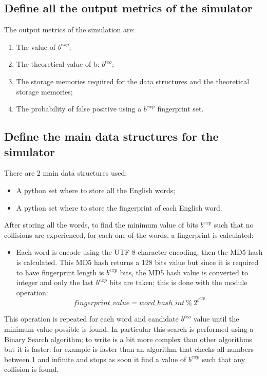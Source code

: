 \documentclass[twocolumn,letterpaper]{report}
\begin{document}
{				\subsection{Define all the output metrics of the simulator}
					The output metrics of the simulation are:
					\begin{enumerate}
							\item The value of $b^{exp}$;
							\item The theoretical value of b: $b^{teo}$;
							\item The storage  memories required for the data structures and the theoretical storage memories;
							\item The probability of false positive using a  $b^{exp}$ fingerprint set.
					\end{enumerate}
			
			\subsection{Define the main data structures for the simulator}
						There are 2 main data structures used: 
							\begin{itemize}
								\item A python set where to store all the English words;
								\item A python set where to store the fingerprint of each English word.
								\end{itemize}
						After storing all the words, to find the minimum value of bits $b^{exp}$ such that no collisions are experienced, for each one of the words, a fingerprint is calculated:
						\begin{itemize}
								\item[] Each word is encode using the UTF-8 character encoding, then the MD5 hash is calculated. This MD5 hash returns a 128 bits value but since it is required to have fingerprint length is $b^{exp}$ bits, the MD5 hash value is converted to integer and only the last  $b^{exp}$ bits are taken; this is done with the module operation: \[ fingerprint\_value = word\_hash\_int \: \% \: 2^{b^{exp}} \]
						\end{itemize}
						This operation is repeated for each word and candidate $b^{teo}$ value until the minimum value possible is found. In particular this search is performed using a Binary Search algorithm; to write is a bit more complex than other algorithms but it is faster: for example is faster than an algorithm that checks all numbers between 1 and infinite and stops as soon it find a value of $b^{exp}$ such that any collision is found.
					
}
\end{document}

